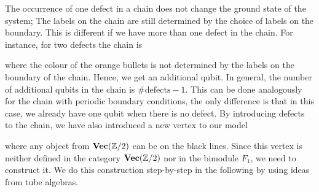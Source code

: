 The occurrence of one defect in a chain does not change the ground state of the system; The labels on the chain are still determined by the choice of labels on the boundary. This is different if we have more than one defect in the chain. For instance, for two defects the chain is
	\begin{figure}[H]
	\end{figure}
\noindent
where the colour of the orange bullets is not determined by the labels on the boundary of the chain. Hence, we get an additional qubit. In general, the number of additional qubits in the chain is $\#\mathrm{defects}-1$. This can be done analogously for the chain with periodic boundary conditions, the only difference is that in this case, we already have one qubit when there is no defect. By introducing defects to the chain, we have also introduced a new vertex to our model
	\begin{figure}[H]	
	\end{figure}
\noindent
where any object from $\textbf{Vec}(\mathbb{Z}/2)$ can be on the black lines. Since this vertex is neither defined in the category $\textbf{Vec}(\mathbb{Z}/2)$ nor in the bimodule $F_1$, we need to construct it. We do this construction step-by-step in the following by using ideas from tube algebras.
